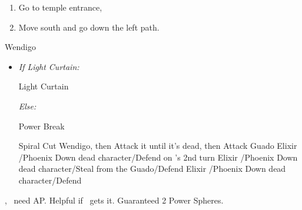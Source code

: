 \begin{enumerate}[resume]
    \item Go to temple entrance, \sd
    \item Move south and go down the left path.
\end{enumerate}
\winvfill
\bothvfill
\begin{battle}[18000]{Wendigo}
    \begin{itemize}
        \tidusf Haste \tidus
        \tidusf Switch Weapon to Brotherhood
        \tidusf Attack Guado B (Top One)
        \item \textit{If Light Curtain:}
        \begin{itemize}
            \rikkuf Light Curtain \tidus
        \end{itemize}
        \textit{Else:}
        \begin{itemize}
            \switch{\rikku}{\auron}
            \auronf Power Break
        \end{itemize}
        \tidusf Spiral Cut Wendigo, then Attack it until it's dead, then Attack Guado
        \yunaf Elixir \tidus/Phoenix Down dead character/Defend
        \switch{\yuna}{\lulu} on \yuna's 2nd turn
        \rikkuf Elixir \tidus/Phoenix Down dead character/Steal from the Guado/Defend
        \luluf Elixir \tidus/Phoenix Down dead character/Defend
    \end{itemize}
    \yuna, \tidus\ need AP. Helpful if \lulu\ gets it.
    Guaranteed 2 Power Spheres.
\end{battle}
